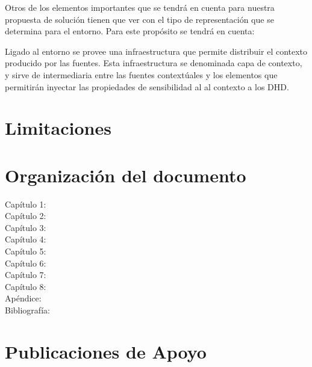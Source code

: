 Otros de los elementos importantes que se tendrá en cuenta para nuestra
propuesta de solución tienen que ver con el tipo de representación que se
determina para el entorno. Para este propósito se tendrá en cuenta:

Ligado al entorno se provee una infraestructura que permite distribuir
el contexto producido por las fuentes. Esta infraestructura se denominada capa
de contexto, y sirve de intermediaria entre las fuentes contextúales y
los elementos que permitirán  inyectar las propiedades de sensibilidad al
al contexto a los DHD.


\section{Limitaciones}	




\section{Organización del documento}

\begin{description}
 \item[Capítulo 1:]
 \item[Capítulo 2:]
 \item[Capítulo 3:]
 \item[Capítulo 4:]
 \item[Capítulo 5:]
 \item[Capítulo 6:]
 \item[Capítulo 7:]
 \item[Capítulo 8:]
 \item[Apéndice:]
 \item[Bibliografía:]
\end{description}


\section{Publicaciones de Apoyo}
